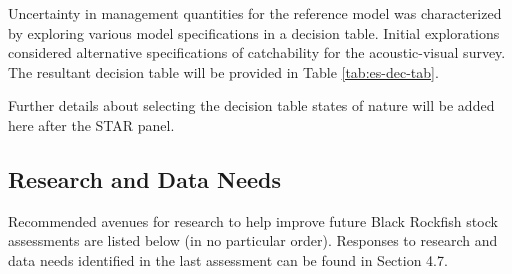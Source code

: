 \documentclass[11pt,
  english,
  letterpaper,
]{article}
\begin{document}


Uncertainty in management quantities for the reference model was characterized by exploring various model specifications in a decision table. Initial explorations considered alternative specifications of catchability for the acoustic-visual survey. The resultant decision table will be provided in Table \ref{tab:es-dec-tab}.

Further details about selecting the decision table states of nature will be added here after the STAR panel.

\clearpage



\clearpage

\hypertarget{research-and-data-needs}{%
\subsection*{Research and Data Needs}\label{research-and-data-needs}}

Recommended avenues for research to help improve future Black Rockfish stock assessments are listed below (in no particular order). Responses to research and data needs identified in the last assessment can be found in Section 4.7.
\end{document}
